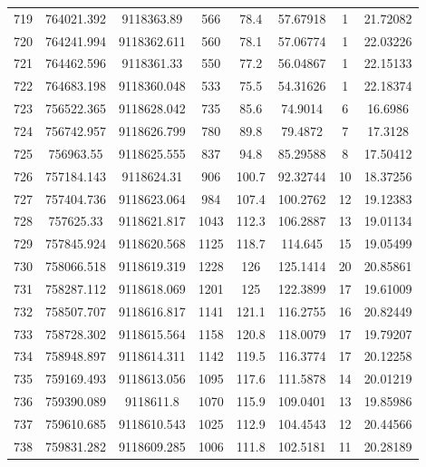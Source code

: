 \begin{longtable}{cccccccc}
719  & 764021.392      & 9118363.89       & 566     & 78.4  & 57.67918 & 1  & 21.72082 \\
720  & 764241.994      & 9118362.611      & 560     & 78.1  & 57.06774 & 1  & 22.03226 \\
721  & 764462.596      & 9118361.33       & 550     & 77.2  & 56.04867 & 1  & 22.15133 \\
722  & 764683.198      & 9118360.048      & 533     & 75.5  & 54.31626 & 1  & 22.18374 \\
723  & 756522.365      & 9118628.042      & 735     & 85.6  & 74.9014  & 6  & 16.6986  \\
724  & 756742.957      & 9118626.799      & 780     & 89.8  & 79.4872  & 7  & 17.3128  \\
725  & 756963.55       & 9118625.555      & 837     & 94.8  & 85.29588 & 8  & 17.50412 \\
726  & 757184.143      & 9118624.31       & 906     & 100.7 & 92.32744 & 10 & 18.37256 \\
727  & 757404.736      & 9118623.064      & 984     & 107.4 & 100.2762 & 12 & 19.12383 \\
728  & 757625.33       & 9118621.817      & 1043    & 112.3 & 106.2887 & 13 & 19.01134 \\
729  & 757845.924      & 9118620.568      & 1125    & 118.7 & 114.645  & 15 & 19.05499 \\
730  & 758066.518      & 9118619.319      & 1228    & 126   & 125.1414 & 20 & 20.85861 \\
731  & 758287.112      & 9118618.069      & 1201    & 125   & 122.3899 & 17 & 19.61009 \\
732  & 758507.707      & 9118616.817      & 1141    & 121.1 & 116.2755 & 16 & 20.82449 \\
733  & 758728.302      & 9118615.564      & 1158    & 120.8 & 118.0079 & 17 & 19.79207 \\
734  & 758948.897      & 9118614.311      & 1142    & 119.5 & 116.3774 & 17 & 20.12258 \\
735  & 759169.493      & 9118613.056      & 1095    & 117.6 & 111.5878 & 14 & 20.01219 \\
736  & 759390.089      & 9118611.8        & 1070    & 115.9 & 109.0401 & 13 & 19.85986 \\
737  & 759610.685      & 9118610.543      & 1025    & 112.9 & 104.4543 & 12 & 20.44566 \\
738  & 759831.282      & 9118609.285      & 1006    & 111.8 & 102.5181 & 11 & 20.28189 \\

\end{longtable}
